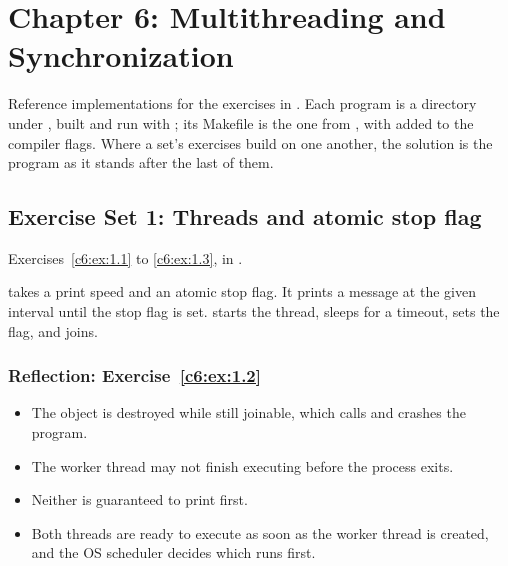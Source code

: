 
\section{Chapter 6: Multithreading and Synchronization}
\label{sol:sec:c6}
Reference implementations for the exercises in . Each program is a
directory under , built and run with ; its
Makefile is the one from , with  added to the compiler
flags. Where a set's exercises build on one another, the solution is the program as it stands
after the last of them.

\subsection{Exercise Set 1: Threads and atomic stop flag}
\label{sol:set:c6.1}
Exercises~\ref{c6:ex:1.1} to \ref{c6:ex:1.3}, in .

 takes a print speed and an atomic stop flag. It prints a message at the given
interval until the stop flag is set.  starts the thread, sleeps for a timeout, sets the
flag, and joins.


\subsubsection{Reflection: Exercise~\ref{c6:ex:1.2}}
\begin{itemize}
  \item The  object is destroyed while still joinable, which calls
     and crashes the program.
  \item The worker thread may not finish executing before the process exits.
\end{itemize}

\begin{itemize}
  \item Neither is guaranteed to print first.
  \item Both threads are ready to execute as soon as the worker thread is created, and the OS
    scheduler decides which runs first.
\end{itemize}

